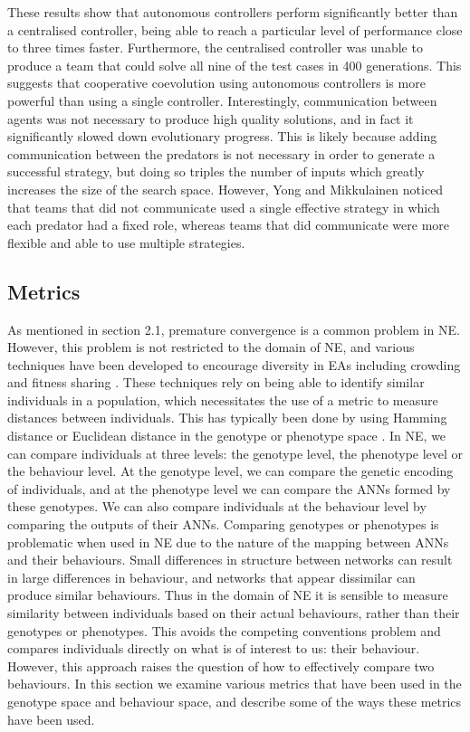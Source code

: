 \documentclass[12pt]{article} %
\begin{document}
These results show that autonomous controllers perform significantly better than a centralised controller, being able to reach a particular level of performance close to three times faster. Furthermore, the centralised controller was unable to produce a team that could solve all nine of the test cases in 400 generations. This suggests that cooperative coevolution using autonomous controllers is more powerful than using a single controller. Interestingly, communication between agents was not necessary to produce high quality solutions, and in fact it significantly slowed down evolutionary progress. This is likely because adding communication between the predators is not necessary in order to generate a successful strategy, but doing so triples the number of inputs which greatly increases the size of the search space. However, Yong and Mikkulainen \cite{Yong2001} noticed that teams that did not communicate used a single effective strategy in which each predator had a fixed role, whereas teams that did communicate were more flexible and able to use multiple strategies.

\subsection{Metrics}

As mentioned in section 2.1, premature convergence is a common problem in NE. However, this problem is not restricted to the domain of NE, and various techniques have been developed to encourage diversity in EAs including crowding \cite{Sareni1998} and fitness sharing \cite{Goldberg1987}\cite{Sareni1998}. These techniques rely on being able to identify similar individuals in a population, which necessitates the use of a metric to measure distances between individuals. This has typically been done by using Hamming distance or Euclidean distance in the genotype or phenotype space \cite{Gomez2009}. In NE, we can compare individuals at three levels: the genotype level, the phenotype level or the behaviour level. At the genotype level, we can compare the genetic encoding of individuals, and at the phenotype level we can compare the ANNs formed by these genotypes. We can also compare individuals at the behaviour level by comparing the outputs of their ANNs. Comparing genotypes or phenotypes is problematic when used in NE due to the nature of the mapping between ANNs and their behaviours. Small differences in structure between networks can result in large differences in behaviour, and networks that appear dissimilar can produce similar behaviours. Thus in the domain of NE it is sensible to measure similarity between individuals based on their actual behaviours, rather than their genotypes or phenotypes. This avoids the competing conventions problem and compares individuals directly on what is of interest to us: their behaviour. However, this approach raises the question of how to effectively compare two behaviours. In this section we examine various metrics that have been used in the genotype space and behaviour space, and describe some of the ways these metrics have been used.
\end{document}

